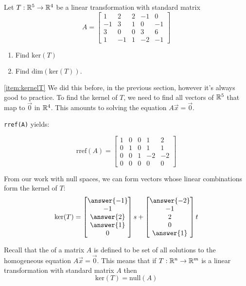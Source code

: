 \documentclass{ximera}
\begin{document}
\begin{example}\label{ex:kernel} Let $T:\mathbb{R}^5\rightarrow \mathbb{R}^4$ be a linear transformation with standard matrix $$A=\begin{bmatrix}1 & 2 & 2 &-1 & 0\\-1 & 3 & 1 & 0 & -1\\3 & 0 & 0 & 3 & 6\\ 1 & -1 & 1 & -2 & -1\end{bmatrix}$$
\begin{enumerate}
\item \label{item:kernelT}
Find $\mbox{ker}(T)$
\item \label{item:dimkernelT}
Find $\mbox{dim}(\mbox{ker}(T))$.
\end{enumerate}
\begin{explanation}

\ref{item:kernelT} We did this before, in the previous section, however it's always good to practice. To find the kernel of $T$, we need to find all vectors of $\mathbb{R}^5$ that map to $\vec{0}$ in $\mathbb{R}^4$.  This amounts to solving the equation $A\vec{x}=\vec{0}$.
 
\texttt{rref(A)} yields:
 
$$\mbox{rref}(A)= \begin{bmatrix} 1 & 0 & 0 & 1 & 2\\0 & 1 & 0 & 1 & 1\\0 & 0 & 1 & -2 & -2\\ 0 & 0 & 0 & 0 & 0 \end{bmatrix}$$
 
From our work with null spaces, we can form vectors whose linear combinations form the kernel of $T$:
$$\mbox{ker}(T)=\begin{bmatrix}\answer{-1}\\-1\\\answer{2}\\\answer{1}\\0\end{bmatrix}s+\begin{bmatrix}\answer{-2}\\-1\\2\\0\\\answer{1}\end{bmatrix}t$$
 
\end{explanation}
\end{example}
 
Recall that the  of a matrix $A$ is defined to be set of all solutions to the homogeneous equation $A\vec{x}=\vec{0}$. This means that  if $T:\mathbb{R}^n\rightarrow \mathbb{R}^m$ is a linear transformation with standard matrix $A$ then
$$\mbox{ker}(T)=\mbox{null}(A)$$
 
\end{document}
